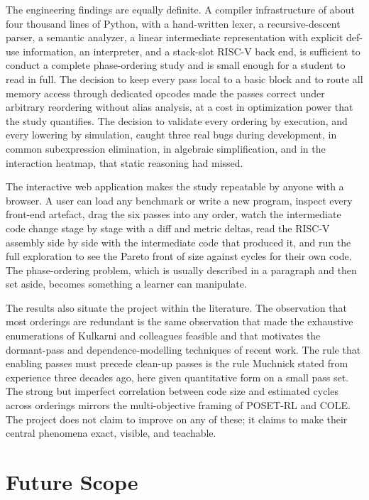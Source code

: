 The engineering findings are equally definite. A compiler infrastructure of about four thousand lines of Python, with a hand-written lexer, a recursive-descent parser, a semantic analyzer, a linear intermediate representation with explicit def-use information, an interpreter, and a stack-slot RISC-V back end, is sufficient to conduct a complete phase-ordering study and is small enough for a student to read in full. The decision to keep every pass local to a basic block and to route all memory access through dedicated opcodes made the passes correct under arbitrary reordering without alias analysis, at a cost in optimization power that the study quantifies. The decision to validate every ordering by execution, and every lowering by simulation, caught three real bugs during development, in common subexpression elimination, in algebraic simplification, and in the interaction heatmap, that static reasoning had missed.

The interactive web application makes the study repeatable by anyone with a browser. A user can load any benchmark or write a new program, inspect every front-end artefact, drag the six passes into any order, watch the intermediate code change stage by stage with a diff and metric deltas, read the RISC-V assembly side by side with the intermediate code that produced it, and run the full exploration to see the Pareto front of size against cycles for their own code. The phase-ordering problem, which is usually described in a paragraph and then set aside, becomes something a learner can manipulate.

The results also situate the project within the literature. The observation that most orderings are redundant is the same observation that made the exhaustive enumerations of Kulkarni and colleagues feasible and that motivates the dormant-pass and dependence-modelling techniques of recent work. The rule that enabling passes must precede clean-up passes is the rule Muchnick stated from experience three decades ago, here given quantitative form on a small pass set. The strong but imperfect correlation between code size and estimated cycles across orderings mirrors the multi-objective framing of POSET-RL and COLE. The project does not claim to improve on any of these; it claims to make their central phenomena exact, visible, and teachable.

\section*{Future Scope}

